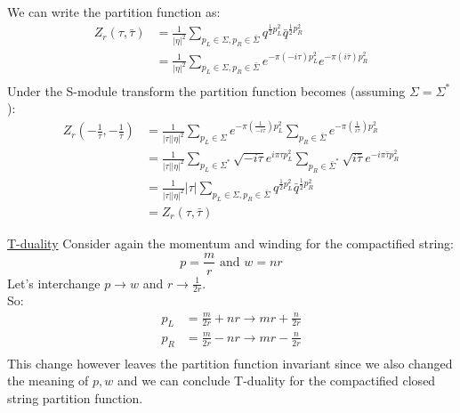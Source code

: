 \documentclass[11pt,aspectratio=169]{beamer}
\begin{document}
\begin{frame}
	We can write the partition function as:
	\begin{align*}
		Z_r (\tau, \bar{\tau}) &= \frac{1}{|\eta|^2} \sum_{p_L\in\Sigma, p_R\in\bar{\Sigma}} q^{\frac{1}{2}p_L^2}\bar{q}^{\frac{1}{2}p_R^2} \\
		&= \frac{1}{|\eta|^2} \sum_{p_L\in\Sigma, p_R\in\bar{\Sigma}} e^{-\pi(-i\tau)p_L^2} e^{-\pi(i\bar{\tau})p_R^2} \\
	\end{align*}
	Under the S-module transform the partition function becomes (assuming $\Sigma = \Sigma^*$):
	\begin{align*}
		Z_r (-\frac{1}{\tau}, -\frac{1}{\bar{\tau}}) &= \frac{1}{|\tau||\eta|^2} \sum_{p_L\in\Sigma}e^{-\pi(\frac{1}{-i\tau})p_L^2}\sum_{p_R\in\bar{\Sigma}}e^{-\pi(\frac{1}{i\bar{\tau}})p_R^2} \\
		&= \frac{1}{|\tau||\eta|^2} \sum_{p_L\in\Sigma^*} \sqrt{-i\tau} e^{i\pi\tau p_L^2} \sum_{p_R\in\bar{\Sigma}^*} \sqrt{i\bar{\tau}} e^{-i\pi\bar{\tau}p_R^2} \\
		&= \frac{1}{|\tau||\eta|^2} |\tau| \sum_{p_L\in\Sigma, p_R\in\bar{\Sigma}} q^{\frac{1}{2}p_L^2}\bar{q}^{\frac{1}{2}p_R^2} \\
		&= Z_r (\tau, \bar{\tau})
	\end{align*}
\end{frame}

\begin{frame}{\underline{T-duality}}
	Consider again the momentum and winding for the compactified string:
	\begin{equation}
		p = \frac{m}{r} \textrm{ and } w = nr
	\end{equation}
	Let's interchange $p \rightarrow w$ and $r \rightarrow \frac{1}{2r}$. 
	\\
	So:
	\begin{align*}
		p_L &= \frac{m}{2r} + nr \rightarrow mr + \frac{n}{2r} \\
		p_R &= \frac{m}{2r} - nr \rightarrow mr - \frac{n}{2r} \\
	\end{align*}
	This change however leaves the partition function invariant since we also changed the meaning of $p, w$ and we can conclude T-duality for the compactified closed string partition function.
\end{frame}
\end{document}
